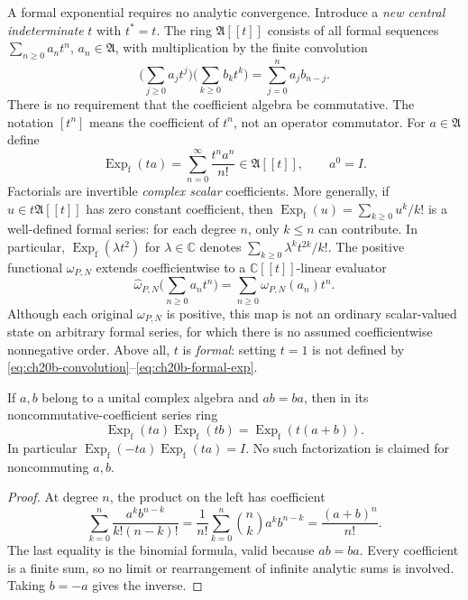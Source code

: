 A formal exponential requires no analytic convergence.  Introduce a
\emph{new central indeterminate} \(t\) with \(t^*=t\).
The ring \(\mathfrak A[[t]]\) consists of all formal sequences
\(\sum_{n\geq0}a_nt^n\), \(a_n\in\mathfrak A\), with multiplication
by the finite convolution
\begin{equation}
 [t^n]\biggl(\sum_{j\geq0}a_jt^j\biggr)
        \biggl(\sum_{k\geq0}b_kt^k\biggr)
 =\sum_{j=0}^n a_jb_{n-j}.
 \label{eq:ch20b-convolution}
\end{equation}
There is no requirement that the coefficient algebra be commutative.
The notation \([t^n]\) means the coefficient of \(t^n\), not an
operator commutator.  For \(a\in\mathfrak A\) define
\begin{equation}
 \operatorname{Exp}_{\mathrm f}(ta)
 =\sum_{n=0}^\infty\frac{t^na^n}{n!}\in\mathfrak A[[t]],
 \qquad a^0=I.
 \label{eq:ch20b-formal-exp}
\end{equation}
Factorials are invertible \emph{complex scalar} coefficients.
More generally, if \(u\in t\mathfrak A[[t]]\) has zero constant
coefficient, then
\(\operatorname{Exp}_{\mathrm f}(u)=\sum_{k\geq0}u^k/k!\)
is a well-defined formal series: for each degree \(n\), only
\(k\leq n\) can contribute.  In particular,
\(\operatorname{Exp}_{\mathrm f}(\lambda t^2)\) for
\(\lambda\in\mathbb C\) denotes
\(\sum_{k\geq0}\lambda^kt^{2k}/k!\).
The positive functional \(\omega_{P,N}\) extends coefficientwise to a
\(\mathbb C[[t]]\)-linear evaluator
\begin{equation}
 \widehat\omega_{P,N}\biggl(\sum_{n\geq0}a_nt^n\biggr)
 =\sum_{n\geq0}\omega_{P,N}(a_n)t^n.
 \label{eq:ch20b-omega-hat}
\end{equation}
Although each original \(\omega_{P,N}\) is positive, this map is not
an ordinary scalar-valued state on arbitrary formal series, for which
there is no assumed coefficientwise nonnegative order.  Above all,
\(t\) is \emph{formal}: setting \(t=1\) is not defined by
\eqref{eq:ch20b-convolution}--\eqref{eq:ch20b-formal-exp}.

\begin{lemma}
\label{lem:ch20b-exp-product}
If \(a,b\) belong to a unital complex algebra and \(ab=ba\), then
in its noncommutative-coefficient series ring
\begin{equation}
 \operatorname{Exp}_{\mathrm f}(ta)
 \operatorname{Exp}_{\mathrm f}(tb)
 =\operatorname{Exp}_{\mathrm f}(t(a+b)).
 \label{eq:ch20b-formal-binomial}
\end{equation}
In particular
\(\operatorname{Exp}_{\mathrm f}(-ta)
 \operatorname{Exp}_{\mathrm f}(ta)=I\).
No such factorization is claimed for noncommuting \(a,b\).
\end{lemma}
\begin{proof}
At degree \(n\), the product on the left has coefficient
\[
 \sum_{k=0}^n\frac{a^kb^{n-k}}{k!(n-k)!}
 =\frac1{n!}\sum_{k=0}^n\binom nk a^kb^{n-k}
 =\frac{(a+b)^n}{n!}.
\]
The last equality is the binomial formula, valid because \(ab=ba\).
Every coefficient is a finite sum, so no limit or rearrangement of
infinite analytic sums is involved.  Taking \(b=-a\) gives the inverse.
\end{proof}


